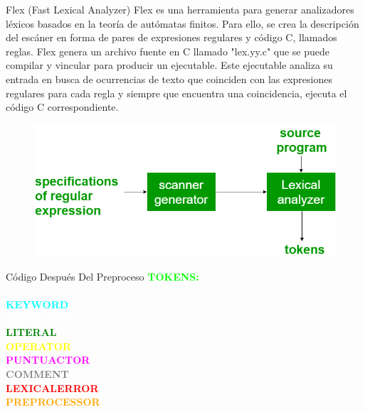 \documentclass[compress]{beamer}
\begin{document}
\begin{frame}{Flex (Fast Lexical Analyzer)}
    \justifying
    Flex es una herramienta para generar analizadores léxicos basados en la teoría de autómatas finitos. Para ello, se crea la descripción del 
    escáner en forma de pares de expresiones regulares y código C, llamados reglas. Flex genera un archivo fuente en C llamado "lex.yy.c" que 
    se puede compilar y vincular para producir un ejecutable. Este ejecutable analiza su entrada en busca de ocurrencias de texto que coinciden 
    con las expresiones regulares para cada regla y siempre que encuentra una coincidencia, ejecuta el código C correspondiente.

    \begin{figure}
        \centering
        \includegraphics[scale=0.3]{images/flex.png}
    \end{figure}
    
\end{frame}

\begin{frame}{Código Después Del Preproceso}
\justifying\centering
\huge
    \textcolor{lime}{\textbf{TOKENS:}} \\ 
\small
    \textcolor{cyan}{\textbf{\\KEYWORD}}
    \textcolor{white}{\textbf{\\IDENTIFIER}}
    \textcolor{green}{\textbf{\\LITERAL}}
    \textcolor{yellow}{\textbf{\\OPERATOR}}
    \textcolor{magenta}{\textbf{\\PUNTUACTOR}}
    \textcolor{gray}{\textbf{\\COMMENT}}
    \textcolor{red}{\textbf{\\LEXICALERROR}}
    \textcolor{orange}{\textbf{\\PREPROCESSOR}}
    
\end{frame}


\end{document}
